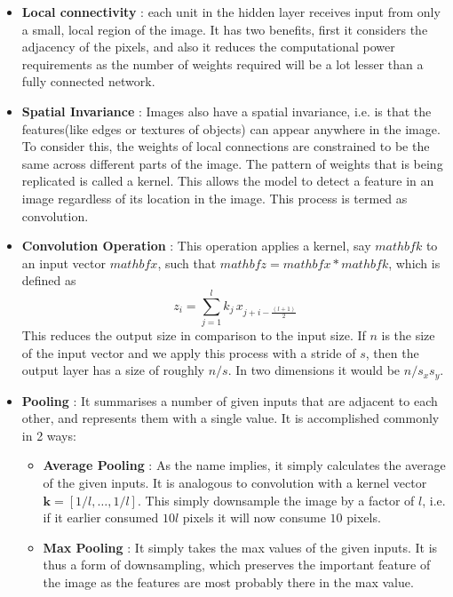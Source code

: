 \documentclass{article}
\begin{document}
  \begin{itemize}
    \item \textbf{Local connectivity} : each unit in the hidden layer receives input from only a small, local region of the image. It has two benefits, first it considers the adjacency of the pixels, and also it reduces the computational power requirements as the number of weights required will be a lot lesser than a fully connected network.
    \item \textbf{Spatial Invariance} : Images also have a spatial invariance, i.e. is that the features(like edges or textures of objects) can appear anywhere in the image. To consider this, the weights of local connections are constrained to be the same across different parts of the image. The pattern of weights that is being replicated is called a kernel. This allows the model to detect a feature in an image regardless of its location in the image. This process is termed as convolution.
    \item \textbf{Convolution Operation} : This operation applies a kernel, say $mathbf{k}$ to an input  vector $mathbf{x}$, such that $mathbf{z } =mathbf{x} * mathbf{k}$, which is defined as
      \begin{equation*}
        z_i = \sum_{j=1}^{l} k_j \, x_{j+i-\frac{(l+1)}{2}}
      \end{equation*}
      This reduces the output size in comparison to the input size. If $n$ is the size of the input vector and we apply this process with a stride of $s$, then the output layer has a size of roughly $n/s$. In two dimensions it would be $n/ s_x s_y$. 
    \item \textbf{Pooling} : It summarises a number of given inputs that are adjacent to each other, and represents them with a single value. It is accomplished commonly in 2 ways:
      \begin{itemize}
        \item \textbf{Average Pooling} : As the name implies, it simply calculates the average of the given inputs. It is analogous to convolution with a kernel vector $\mathbf{k} = [1/l,\ldots,1/l]$. This simply downsample the image by a factor of $l$, i.e. if it earlier consumed $10l$ pixels it will now consume $10$ pixels.
        \item \textbf{Max Pooling} : It simply takes the max values of the given inputs. It is thus a form of downsampling, which preserves the important feature of the image as the features are most probably there in the max value.
      \end{itemize}

\end{itemize}
\end{document}
